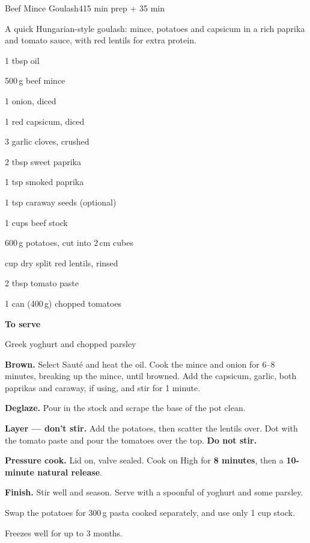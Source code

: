 \begin{recipebox}{Beef Mince Goulash}{4}{15 min prep + 35 min}

A quick Hungarian-style goulash: mince, potatoes and capsicum in a rich paprika
and tomato sauce, with red lentils for extra protein.

\begin{ingredients}
  \item 1 tbsp oil
  \item 500\,g beef mince
  \item 1 onion, diced
  \item 1 red capsicum, diced
  \item 3 garlic cloves, crushed
  \item 2 tbsp sweet paprika
  \item 1 tsp smoked paprika
  \item 1 tsp caraway seeds (optional)
  \item 1 cups beef stock
  \item 600\,g potatoes, cut into 2\,cm cubes
  \item {} cup dry split red lentils, rinsed
  \item 2 tbsp tomato paste
  \item 1 can (400\,g) chopped tomatoes
  \item[] \textbf{To serve}
  \item Greek yoghurt and chopped parsley
\end{ingredients}

\begin{method}
  \item \textbf{Brown.} Select Saut\'e and heat the oil. Cook the mince and onion for
        6--8 minutes, breaking up the mince, until browned. Add the capsicum,
        garlic, both paprikas and caraway, if using, and stir for 1 minute.
  \item \textbf{Deglaze.} Pour in the stock and scrape the base of the pot clean.
  \item \textbf{Layer --- don't stir.} Add the potatoes, then scatter the lentils
        over. Dot with the tomato paste and pour the tomatoes over the top.
        \textbf{Do not stir.}
  \item \textbf{Pressure cook.} Lid on, valve sealed. Cook on High for
        \textbf{8 minutes}, then a \textbf{10-minute natural release}.
  \item \textbf{Finish.} Stir well and season. Serve with a spoonful of yoghurt and
        some parsley.
\end{method}

\begin{notelist}
  \item Swap the potatoes for 300\,g pasta cooked separately, and use only 1 cup
        stock.
  \item Freezes well for up to 3 months.
\end{notelist}

\end{recipebox}
